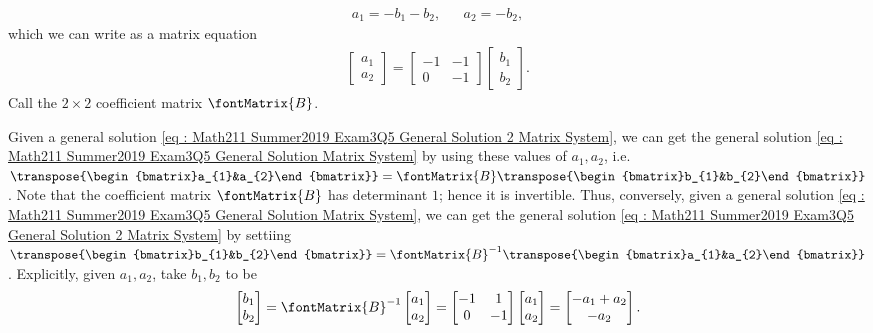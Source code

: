 \begin{remark}
\begin{align*}
a_{1}
=
-b_{1} - b_{2},
&&
a_{2}
=
-b_{2},
\end{align*}
which we can write as a matrix equation
\begin{align}
\begin{bmatrix}%
a_{1}	\\
a_{2}
\end{bmatrix}%
=
\begin{bmatrix}%
-1	&	-1	\\
0	&	-1
\end{bmatrix}%
\begin{bmatrix}%
b_{1}	\\
b_{2}
\end{bmatrix}%
.%
\label{eq : Math211 Summer2019 Exam3Q5 Change Of Basis}
\end{align}
Call the $2 \times 2$ coefficient matrix $\fontMatrix{B}$.

Given a general solution \eqref{eq : Math211 Summer2019 Exam3Q5 General Solution 2 Matrix System}, we can get the general solution \eqref{eq : Math211 Summer2019 Exam3Q5 General Solution Matrix System} by using these values of $a_{1},a_{2}$, i.e. $\transpose{\begin{bmatrix}a_{1}&a_{2}\end{bmatrix}} = \fontMatrix{B} \transpose{\begin{bmatrix}b_{1}&b_{2}\end{bmatrix}}$. Note that the coefficient matrix $\fontMatrix{B}$ has determinant $1$; hence it is invertible. Thus, conversely, given a general solution \eqref{eq : Math211 Summer2019 Exam3Q5 General Solution Matrix System}, we can get the general solution \eqref{eq : Math211 Summer2019 Exam3Q5 General Solution 2 Matrix System} by settiing $\transpose{\begin{bmatrix}b_{1}&b_{2}\end{bmatrix}} = \fontMatrix{B}^{-1} \transpose{\begin{bmatrix}a_{1}&a_{2}\end{bmatrix}}$. Explicitly, given $a_{1},a_{2}$, take $b_{1},b_{2}$ to be
\begin{align*}
\begin{bmatrix}%
b_{1}	\\
b_{2}
\end{bmatrix}%
=
\fontMatrix{B}^{-1}
\begin{bmatrix}%
a_{1}	\\
a_{2}
\end{bmatrix}%
=
\begin{bmatrix}%
-1	&	1	\\
0	&	-1
\end{bmatrix}%
\begin{bmatrix}%
a_{1}	\\
a_{2}
\end{bmatrix}%
=
\begin{bmatrix}%
-a_{1} + a_{2}	\\
-a_{2}
\end{bmatrix}%
.
\end{align*}


\end{remark}
